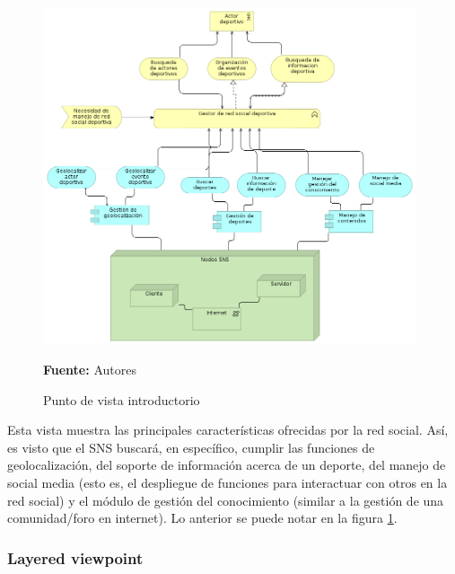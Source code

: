 \begin{figure}[!htb]
  \begin{center}
    \includegraphics[width=11cm]{./imagenes/Archimate/vistas/generales/introductory.png}
    \caption{Punto de vista introductorio}
    \label{fig:introductory}
    \textbf{Fuente:}  Autores \\
  \end{center}
\end{figure}

Esta vista muestra las principales características ofrecidas por la red social. Así, es visto que el SNS buscará, en específico, cumplir las funciones de geolocalización, del soporte de información acerca de un deporte, del manejo de social media (esto es, el despliegue de funciones para interactuar con otros en la red social) y el módulo de gestión del conocimiento (similar a la gestión de una comunidad/foro en internet). Lo anterior se puede notar en la figura \ref{fig:introductory}.

\subsubsection{Layered viewpoint}

